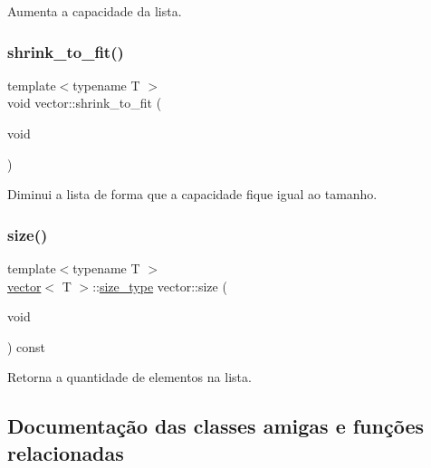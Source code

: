 Aumenta a capacidade da lista. 

\mbox{\label{classsc_1_1vector_a9468a8d103dfe4b4979d26668cab9c63}} 
\subsubsection{\texorpdfstring{shrink\+\_\+to\+\_\+fit()}{shrink\_to\_fit()}}
{\footnotesize\ttfamily template$<$typename T $>$ \\
void vector\+::shrink\+\_\+to\+\_\+fit (\begin{DoxyParamCaption}\item[{void}]{ }\end{DoxyParamCaption})}



Diminui a lista de forma que a capacidade fique igual ao tamanho. 

\mbox{\label{classsc_1_1vector_afee521145d4c91a523a4ab3c605296a2}} 
\subsubsection{\texorpdfstring{size()}{size()}}
{\footnotesize\ttfamily template$<$typename T $>$ \\
\hyperlink{classsc_1_1vector}{vector}$<$ T $>$\+::\hyperlink{classsc_1_1vector_a48bf37ba1a6d0c13504414d86e27c399}{size\+\_\+type} vector\+::size (\begin{DoxyParamCaption}\item[{void}]{ }\end{DoxyParamCaption}) const}



Retorna a quantidade de elementos na lista. 



\subsection{Documentação das classes amigas e funções relacionadas}
\mbox{\label{classsc_1_1vector_a889e37c4415a33fb90d8b564bf428e24}} 
